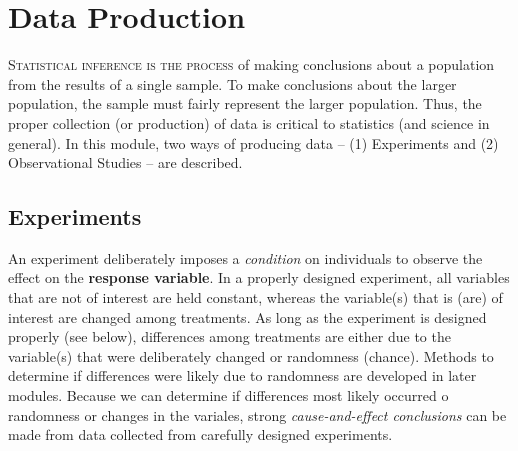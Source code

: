 \documentclass[10pt,openany]{book}\usepackage[]{graphicx}\usepackage[]{color}
\begin{document}

\vspace{-12pt}



\chapter{Data Production} \label{chap:DataProd}

\minitoc
\vspace{24pt}

\lettrine{S}{tatistical inference is the process} of making conclusions about a population from the results of a single sample. To make conclusions about the larger population, the sample must fairly represent the larger population. Thus, the proper collection (or production) of data is critical to statistics (and science in general). In this module, two ways of producing data -- (1) Experiments and (2) Observational Studies -- are described.



\section{Experiments}
An experiment deliberately imposes a \textit{condition} on individuals to observe the effect on the \textbf{response variable}. In a properly designed experiment, all variables that are not of interest are held constant, whereas the variable(s) that is (are) of interest are changed among treatments. As long as the experiment is designed properly (see below), differences among treatments are either due to the variable(s) that were deliberately changed or randomness (chance). Methods to determine if differences were likely due to randomness are developed in later modules. Because we can determine if differences most likely occurred o randomness or changes in the variales, strong \textit{cause-and-effect conclusions} can be made from data collected from carefully designed experiments.
\end{document}
